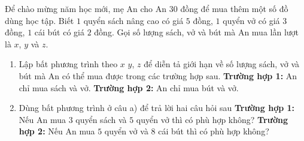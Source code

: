\begin{bt}%
	Để chào mừng năm học mới, mẹ An cho An $30$ đồng để mua thêm một số đồ dùng  học tập. Biết $1$ quyển sách nâng cao có giá $5$ đồng, $1$ quyển vở có giá $3$ đồng, $1$ cái bút có giá $2$ đồng. Gọi số lượng sách, vở và bút mà An mua lần lượt là $x$, $y$ và $z$.
	\begin{enumerate}
		\item Lập bất phương trình theo $x$ $y$, $z$ để diễn tả giới hạn về số lượng sách, vở và bút  mà An có thể mua được trong các trường hợp sau.
		 \textbf{Trường hợp 1:} An chỉ mua sách và vở.
		\textbf{Trường hợp 2:} An chỉ mua bút và vở. 
		\item Dùng bất  phương trình ở câu a) để trả lời hai câu hỏi sau
		\textbf{Trường hợp 1:} Nếu An mua $3$ quyển sách và $5$ quyển  vở thì có phù hợp không?
		\textbf{Trường hợp 2:} Nếu An mua $5$ quyển vở và  $8$ cái bút thì có phù hợp không?
	\end{enumerate}
\end{bt}

